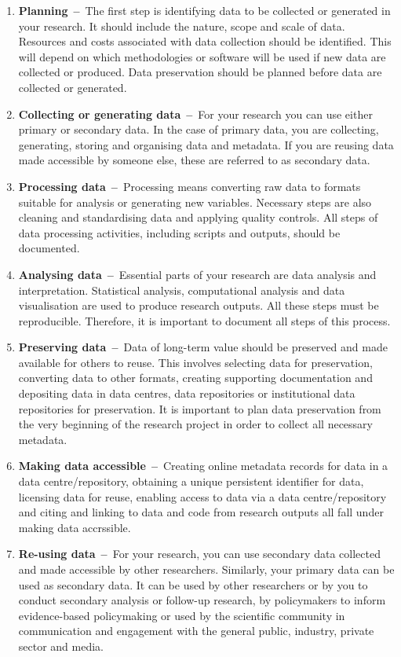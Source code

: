 \documentclass[
]{book}
\begin{document}
\begin{enumerate}
\def\labelenumi{\arabic{enumi}.}
\item
  \textbf{Planning}~\textbf{--}~The first step is identifying data to be collected or generated in your research. It should include the nature, scope and scale of data. Resources and costs associated with data collection should be identified. This will depend on which methodologies or software will be used if new data are collected or produced. Data preservation should be planned before data are collected or generated.
\item
  \textbf{Collecting or generating data}~\textbf{--}~For your research you can use either primary or secondary data. In the case of primary data, you are collecting, generating, storing and organising data and metadata. If you are reusing data made accessible by someone else, these are referred to as secondary data.
\item
  \textbf{Processing data}~\textbf{--}~Processing means converting raw data to formats suitable for analysis or generating new variables. Necessary steps are also cleaning and standardising data and applying quality controls. All steps of data processing activities, including scripts and outputs, should be documented.
\item
  \textbf{Analysing data}~\textbf{--}~Essential parts of your research are data analysis and interpretation. Statistical analysis, computational analysis and data visualisation are used to produce research outputs. All these steps must be reproducible. Therefore, it is important to document all steps of this process.
\item
  \textbf{Preserving data}~\textbf{--}~Data of long-term value should be preserved and made available for others to reuse. This involves selecting data for preservation, converting data to other formats, creating supporting documentation and depositing data in data centres, data repositories or institutional data repositories for preservation. It is important to plan data preservation from the very beginning of the research project in order to collect all necessary metadata.
\item
  \textbf{Making data accessible}~\textbf{--}~Creating online metadata records for data in a data centre/repository, obtaining a unique persistent identifier for data, licensing data for reuse, enabling access to data via a data centre/repository and citing and linking to data and code from research outputs all fall under making data accrssible.
\item
  \textbf{Re-using data}~\textbf{--}~For your research, you can use secondary data collected and made accessible by other researchers. Similarly, your primary data can be used as secondary data. It can be used by other researchers or by you to conduct secondary analysis or follow-up research, by policymakers to inform evidence-based policymaking or used by the scientific community in communication and engagement with the general public, industry, private sector and media.
\end{enumerate}
\end{document}
